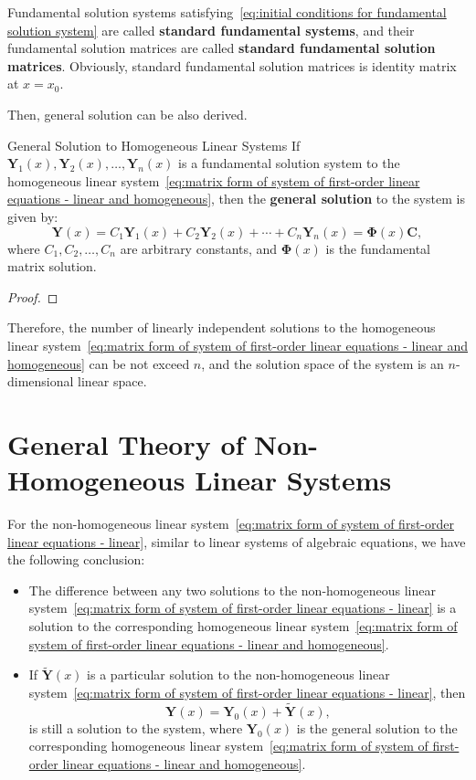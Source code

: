 \documentclass[11pt]{../../TexTemplate/elegantbook}
\begin{document}
Fundamental solution systems satisfying~\eqref{eq:initial conditions for fundamental solution system}
are called \textbf{standard fundamental systems}, 
and their fundamental solution matrices are called \textbf{standard fundamental solution matrices}.
Obviously, standard fundamental solution matrices is identity matrix at \(x = x_{0}\).

Then, general solution can be also derived.
\begin{theorem}{General Solution to Homogeneous Linear Systems}\label{theorem:general solution to homogeneous linear systems}
    If \(\mathbf{Y}_{1}(x), \mathbf{Y}_{2}(x), \ldots, \mathbf{Y}_{n}(x)\) is a fundamental solution system to 
    the homogeneous linear system~\eqref{eq:matrix form of system of first-order linear equations - linear and homogeneous},
    then the \textbf{general solution} to the system is given by:
    \[
    \mathbf{Y}(x) = C_{1} \mathbf{Y}_{1}(x) + C_{2} \mathbf{Y}_{2}(x) + \cdots + C_{n} \mathbf{Y}_{n}(x) 
    = \mathbf{\Phi}(x) \mathbf{C},
    \]
    where \(C_{1}, C_{2}, \ldots, C_{n}\) are arbitrary constants, and \(\mathbf{\Phi}(x)\) is the fundamental matrix solution.
\end{theorem}
\begin{proof}
    
\end{proof}

Therefore, the number of linearly independent solutions to
the homogeneous linear system~\eqref{eq:matrix form of system of first-order linear equations - linear and homogeneous}
can be not exceed \(n\),
and the solution space of the system is an \(n\)-dimensional linear space.

\section{General Theory of Non-Homogeneous Linear Systems}
For the non-homogeneous linear system~\eqref{eq:matrix form of system of first-order linear equations - linear},
similar to linear systems of algebraic equations,
we have the following conclusion:
\begin{itemize}
    \item The difference between any two solutions to
    the non-homogeneous linear system~\eqref{eq:matrix form of system of first-order linear equations - linear}
    is a solution to the corresponding homogeneous linear 
    system~\eqref{eq:matrix form of system of first-order linear equations - linear and homogeneous}. 
    \item If \(\tilde{\mathbf{Y}}(x)\) is a particular solution to 
    the non-homogeneous linear system~\eqref{eq:matrix form of system of first-order linear equations - linear}, 
    then
    \[
    \mathbf{Y}(x) = \mathbf{Y}_{0}(x) + \tilde{\mathbf{Y}}(x),
    \]
    is still a solution to the system,
    where \(\mathbf{Y}_{0}(x)\) is the general solution to the
    corresponding homogeneous linear 
    system~\eqref{eq:matrix form of system of first-order linear equations - linear and homogeneous}.
\end{itemize}
\end{document}
